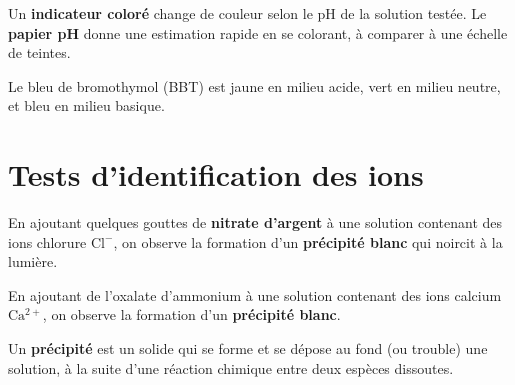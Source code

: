 \begin{illus}
\end{illus}

\begin{propriete}
Un \textbf{indicateur coloré} change de couleur selon le pH de la solution testée. Le
\textbf{papier pH} donne une estimation rapide en se colorant, à comparer à une échelle de
teintes.
\end{propriete}

\begin{exemple}
Le bleu de bromothymol (BBT) est jaune en milieu acide, vert en milieu neutre, et bleu en
milieu basique.
\end{exemple}

\section{Tests d'identification des ions}

\begin{propriete}
En ajoutant quelques gouttes de \textbf{nitrate d'argent} à une solution contenant des
ions chlorure $\mathrm{Cl^-}$, on observe la formation d'un \textbf{précipité blanc} qui
noircit à la lumière.
\end{propriete}

\begin{propriete}
En ajoutant de l'oxalate d'ammonium à une solution contenant des ions calcium
$\mathrm{Ca^{2+}}$, on observe la formation d'un \textbf{précipité blanc}.
\end{propriete}

\begin{remarque}
Un \textbf{précipité} est un solide qui se forme et se dépose au fond (ou trouble) une
solution, à la suite d'une réaction chimique entre deux espèces dissoutes.
\end{remarque}

